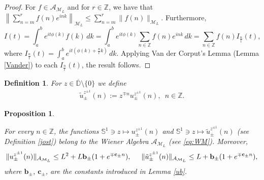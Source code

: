 \documentclass[12pt,oneside,onecolumn,open]{article}
\newtheorem{defi}[teo]{Definition}
\newtheorem{propo}[teo]{Proposition}
\begin{document}
\begin{proof}

For $f\in \mathcal{A}_{\mathcal{M}_L}$ and for $r\in \mathbb{Z}$, we have that 
$
\left\|\sum_{n=m}^{r} f(n) e^{i n k}\right\|_{\mathcal{M}_L} \leq \sum_{n=m}^{r} \|f(n)\|_{\mathcal{M}_L} .
$
Furthermore, 
\[
I(t) = \int_{a}^{b} e^{it\phi(k)} f(k) \, dk = \int_{a}^{b} e^{it\phi(k)} \sum_{n \in \mathbb{Z}} f(n) e^{i nk} \, dk = \sum_{n \in \mathbb{Z}} f(n) I_{\frac{n}{t}}(t),
\]
where 
$
I_{\frac{n}{t}}(t) = \int_{a}^{b} e^{i t \left(\phi(k) + \frac{n}{t} k\right)} \, dk.
$
Applying Van der Corput's Lemma (Lemma \ref{Vander}) to each \(I_{\frac{n}{t}}(t)\), the result follows.
\end{proof}

\begin{defi}\label{utilde} For $z\in \overline{\mathbb{D}}\setminus \{0\}$ we define 
\begin{align}
    \tilde{u}_{\pm }^{z^{\pm 1}}(n):=z^{\mp n}u_{\pm }^{z^{\pm 1}}(n),\,\,\, n\in \mathbb{Z}.
\end{align} 
    
\end{defi}

\begin{propo} \label{Abound}

For every $ n \in \mathbb{Z} $, the functions $  \mathbb{S}^{1}\ni z \mapsto u^{z^{\pm 1}}_{\pm}(n)$
and  $  \mathbb{S}^{1}\ni z \mapsto \tilde{u}^{z^{\pm 1}}_{\pm}(n)$ (see Definition \ref{jost}) belong to the Wiener Algebra $   \mathcal{A}_{\mathcal{M}_L}  $ (see \eqref{eq:WM}).  Moreover, 
\begin{align}
\|u^{z^{\pm 1}}_{\pm}(n)\|_{ \mathcal{A}_{\mathcal{M}_L} } \leq L^2+ L\mathbf{b}_{\pm }(1+e^{\mp \mathbf{c_\pm }n}),
\hspace{0.5cm}
\|\tilde{u}^{z^{\pm 1}}_{\pm}(n)\|_{ \mathcal{A}_{\mathcal{M}_L} } \leq L+   \mathbf{b}_{\pm }(1+e^{\mp \mathbf{c_\pm }n}),
\end{align}
where $\mathbf{b}_\pm$, $\mathbf{c}_\pm$, are the constants introduced in Lemma \ref{ub}. 


    
\end{propo}
\end{document}
